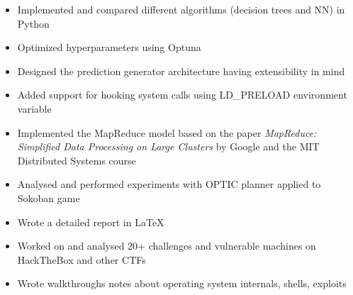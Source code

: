 \documentclass{resume}
\begin{document}
\begin{itemize}
  \item Implemented and compared different algorithms (decision trees and NN) in Python
  \item Optimized hyperparameters using Optuna
  \item Designed the prediction generator architecture having extensibility in mind
\end{itemize}

\begin{itemize}
  \item Added support for hooking system calls using LD\_PRELOAD environment variable
\end{itemize}

\begin{itemize}
  \item Implemented the MapReduce model based on the paper \textit{MapReduce: Simplified Data Processing on Large Clusters} by Google and the MIT Distributed Systems course
\end{itemize}

\begin{itemize}
  \item Analysed and performed experiments with OPTIC planner applied to Sokoban game
  \item Wrote a detailed report in \LaTeX
\end{itemize}

\begin{itemize}
  \item Worked on and analysed 20+ challenges and vulnerable machines on HackTheBox and other CTFs
  \item Wrote walkthroughs notes about operating system internals, shells, exploits
\end{itemize}
\end{document}
